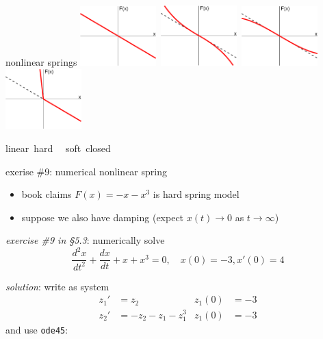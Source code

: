 \documentclass[urlcolor=blue,dvipsnames]{beamer}
\begin{document}
\begin{frame}{nonlinear springs}
\mbox{\includegraphics[width=0.22\textwidth]{figs/spring-linear} \quad
\includegraphics[width=0.22\textwidth]{figs/spring-hard} \quad
\includegraphics[width=0.22\textwidth]{figs/spring-soft} \quad
\includegraphics[width=0.22\textwidth]{figs/spring-closed}}

\mbox{\qquad linear \qquad\qquad\quad hard \qquad\qquad\quad\,\, soft \qquad\qquad\quad closed}
\end{frame}


\begin{frame}{exerise \#9: numerical nonlinear spring}

\begin{itemize}
\item book claims $F(x)=-x-x^3$ is hard spring model
\item suppose we also have damping (expect $x(t)\to 0$ as $t\to \infty$)
\end{itemize}

\noindent \emph{exercise \#9 in \S5.3}:  numerically solve
    $$\frac{d^2 x}{dt^2} + \frac{dx}{dt} + x + x^3 = 0, \quad x(0)=-3, x'(0)=4$$

\noindent \emph{solution}:  write as system
\begin{align*}
z_1' &= z_2  & z_1(0)&=-3 \\
z_2' &= -z_2 - z_1 - z_1^3 & z_1(0)&=-3
\end{align*}
and use \texttt{ode45}:

\end{frame}
\end{document}
